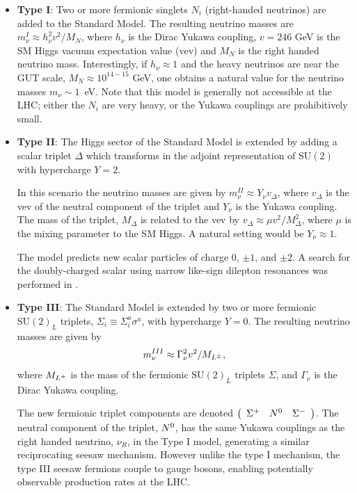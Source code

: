 \begin{itemize}
\item \textbf{Type I}: Two or more
fermionic singlets $N_i$ (right-handed neutrinos) are added to the Standard Model. The resulting neutrino
masses are $m_\nu^I \approx h_{\nu}^2v^2/M_{N}$, where $h_{\nu}$ is the
Dirac Yukawa coupling, $v=246$ GeV is the SM Higgs vacuum expectation
value (vev) and $M_{N}$ is the right handed neutrino mass. Interestingly, if $h_{\nu} \approx 1$ and the heavy neutrinos are near the GUT scale, $M_{N} \approx 10^{14-15}$ GeV, one obtains a natural value for the
neutrino masses $m_\nu \sim 1$~eV. Note that this model is generally not accessible at the LHC; either the $N_i$ are very heavy, or the Yukawa couplings are prohibitively small.

\item \textbf{Type II}: The Higgs sector of the Standard Model is extended by adding a scalar triplet $\Delta$ which transforms in the adjoint representation of $\mbox{SU}(2)$ with hypercharge $Y=2$.

In this scenario the neutrino masses are given by
  $m_\nu^{II} \approx Y_\nu v_\Delta$, where $v_\Delta$ is the vev of
  the neutral component of the triplet and $Y_\nu$ is the Yukawa
  coupling. The mass of the triplet, $M_\Delta$ is related to the vev by $v_\Delta
  \approx \mu v^2 / M_\Delta^2$, where $\mu$ is the mixing parameter
  to the SM Higgs. A natural setting would be $Y_\nu\approx 1$.

The model predicts new scalar particles of charge $0$, $\pm1$, and $\pm2$. A search for the doubly-charged scalar using narrow like-sign dilepton resonances was performed in \cite{ATLAS:2012hi}.

\item \textbf{Type III}: The Standard Model is extended by two or more fermionic $\mbox{SU}(2)_L$ triplets, $\Sigma_i\equiv \Sigma_i^a \sigma^a$, with hypercharge $Y=0$. The resulting neutrino masses are given by 
\begin{equation}
  m_\nu^{III}\approx \Gamma_\nu^2 v^2/M_{L^{\pm}},
\end{equation}
where $M_{L^{\pm}}$ is the mass of the fermionic $\mbox{SU}(2)_L$ triplets $\Sigma$, and $\Gamma_\nu$ is the Dirac Yukawa coupling.

The new fermionic triplet components are denoted $\left(\begin{array}{ccc} \Sigma^{+} & N^{0} & \Sigma^{-}\end{array}\right)$. The neutral component of the triplet, $N^{0}$, has the same Yukawa couplings as the right handed neutrino, $\nu_{R}$, in the Type I model, generating a similar reciprocating seesaw mechanism. However unlike the type I mechanism, the type III seesaw fermions couple to gauge bosons, enabling potentially observable production rates at the LHC. 

\end{itemize}


